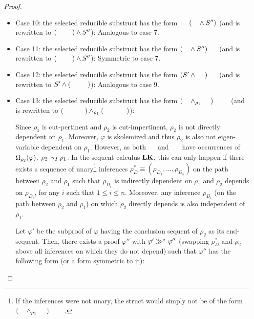 \begin{proof}
\begin{itemize}
	\item Case 10: the selected reducible substruct has the form $\hF{S} \hF{\structtimes} (\hF{S'} \structplus S'')$ (and is rewritten to $(\hF{S} \hF{\structtimes} \hF{S'}) \structplus S''$): Analogous to case 7.

	\item Case 11: the selected reducible substruct has the form $(\hF{S'} \structplus S'') \hF{\structtimes} \hF{S}$ (and is rewritten to $(\hF{S'} \hF{\structtimes} \hF{S} ) \structplus S''$): Symmetric to case 7.

	\item Case 12: the selected reducible substruct has the form $(S' \structplus \hF{S''}) \hF{\structtimes} \hF{S}$ (and is rewritten to $S' \structplus (\hF{S''} \hF{\structtimes} \hF{S} )$): Analogous to case 9.

	\item Case 13: the selected reducible substruct has the form $(\hF{S'} \structplus_{\rho_1} \hF{S''}) \hF{\structtimes_{\rho_2}} \hF{S}$ (and is rewritten to $(\hF{S'} \hF{\structtimes_{\rho_2}} \hF{S}) \structplus_{\rho_1} (\hF{S''} \hF{\structtimes_{\rho_2}} \hF{S})$):


Since $\rho_1$ is cut-pertinent and $\rho_2$ is cut-impertinent, $\rho_2$ is not directly dependent on $\rho_1$. Moreover, $\varphi$ is skolemized and thus $\rho_2$ is also not eigen-variable dependent on $\rho_1$. However, as both $\hF{S'}$ and $\hF{S''}$ have occurrences of $\Omega_{\rho_2}(\varphi)$,  $\rho_2 \prec_I \rho_1$. In the sequent calculus $\mathbf{LK}$, this can only happen if there exists a sequence of unary\footnote{If the inferences were not unary, the struct would simply not be of the form $(\hF{S'} \structplus_{\rho_1} \hF{S''}) \hF{\structtimes_{\rho_2}} \hF{S}$.} inferences $\rho^*_D \equiv (\rho_{D_1},\ldots,\rho_{D_n})$ on the path between $\rho_2$ and $\rho_1$ such that $\rho_{D_i}$ is indirectly dependent on $\rho_1$ and $\rho_2$ depends on $\rho_{D_i}$, for any $i$ such that $1 \leq i \leq n$. Moreover, any inference $\rho_{D_i}$ (on the path between $\rho_2$ and $\rho_1$) on which $\rho_2$ directly depends is also independent of $\rho_1$.

Let $\varphi'$ be the subproof of $\varphi$ having the conclusion sequent of $\rho_2$ as its end-sequent. Then, there exists a proof $\varphi''$ with $\varphi' \gg^* \varphi''$ (swapping $\rho^*_D$ and $\rho_2$ above all inferences on which they do not depend) such that $\varphi''$ has the following form (or a form symmetric to it):


\end{itemize}
\end{proof}
